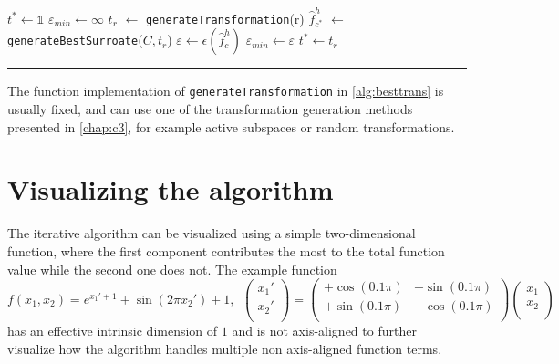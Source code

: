 \documentclass[
  a4paper,  %
  twoside,  %
  bibliography=totoc,
  headsepline,
  cleardoublepage=empty,
  parskip=half,
  draft=false
]{scrbook}
\newcommand{\delimit}{{\color{charcoal}\noindent\rule{\textwidth}{1pt}}}
\begin{document}
\begin{mdframed}[style=algstyle,frametitle={\textbf{function} \texttt{generateBestTransformation}{$(r_{\text{min}} ,r_{\text{max}})$}}]
\normalsize
\vspace{5.5mm}
\begin{algorithmic}[1]
    \State $t^\ast \gets \mathds{1}$
    \State $\varepsilon_{min} \gets \infty$
      \State $t_r$ $\gets$ \texttt{generateTransformation}(r)
      \State $\hat{f}_{c^\ast}^h$ $\gets$ \texttt{generateBestSurroate}($C, t_r$)
    	\State $\varepsilon \gets \epsilon(\hat{f}_c^h)$
    	  \State $\varepsilon_{min}\gets \varepsilon$
    	\State $t^\ast \gets t_r$
    	\EndIf
    \EndFor
    \State {}
\end{algorithmic}
\vspace{-1.5mm}
\delimit
	\label{alg:besttrans}
\end{mdframed}

The function implementation of \texttt{generateTransformation} in \cref{alg:besttrans} is usually fixed, and can use one of the transformation generation methods presented in \cref{chap:c3}, for example active subspaces or random transformations.

\section{Visualizing the algorithm}

The iterative algorithm can be visualized using a simple two-dimensional function, where the first component contributes the most to the total function value while the second one does not.
The example function
\begin{equation}
f(x_1, x_2)=e^{x_1' + 1} + \sin(2 \pi x_2') + 1, ~~ \begin{pmatrix}
    x_1' \\ x_2'
    \\
  \end{pmatrix} = \begin{pmatrix}
    +\cos(0.1 \pi) & -\sin(0.1 \pi)\\
    +\sin(0.1 \pi) & +\cos(0.1 \pi)
    \\
  \end{pmatrix}\begin{pmatrix}
    x_1 \\ x_2
    \\
  \end{pmatrix}
\end{equation}
has an effective intrinsic dimension of $1$ and is not axis-aligned to further visualize how the algorithm handles multiple non axis-aligned function terms.
\end{document}
